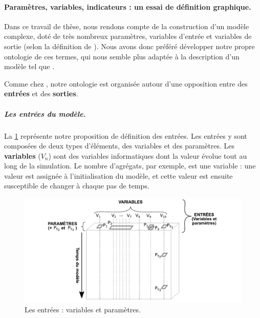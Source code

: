 \paragraph{Paramètres, variables, indicateurs : un essai de définition graphique.}\label{subsubsec:mes_definitions_params}

Dans ce travail de thèse, nous rendons compte de la construction d'un modèle complexe, doté de très nombreux paramètres, variables d'entrée et variables de sortie (selon la définition de \citeauthor{balci_validation_1994}).
Nous avons donc préféré développer notre propre \og ontologie\fg{} de ces termes, qui nous semble plus adaptée à la description d'un modèle tel que \simfeodal{}.

Comme chez \citeauthor{balci_validation_1994}, notre ontologie est organisée autour d'une opposition entre des \textbf{entrées} et des \textbf{sorties}.
\clearpage

\subparagraph{Les entrées du modèle.}
La \cref{fig:parametres-these-entrees} représente notre proposition de définition des entrées.
Les entrées y sont composées de deux types d'éléments, des variables et des paramètres.
Les \textbf{variables} ($V_n$) sont des variables informatiques dont la valeur évolue tout au long de la simulation.
Le nombre d'agrégats, par exemple, est une variable : une valeur est assignée à l'initialisation du modèle, et cette valeur est ensuite susceptible de changer à chaque pas de temps.

\begin{figure}[H]
	\includegraphics[width=\linewidth]{img/schemas_params_1_entrees.pdf}
	\caption{Les entrées : variables et paramètres.} 
	\label{fig:parametres-these-entrees} 
\end{figure}

